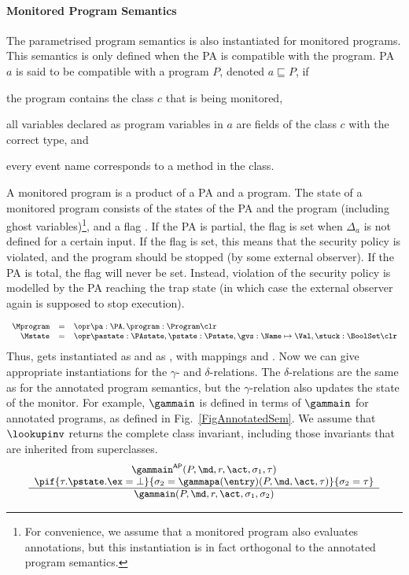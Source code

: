 \paragraph{Monitored Program Semantics}
The parametrised program semantics is also instantiated for monitored
programs. This semantics is only defined when the PA is compatible
with the program. PA \(a\) is said to be compatible with a program
\(P\), denoted \(a \sqsubseteq P\), if
\begin{inparaenum}
\item the program contains the class \(c\) that is being monitored,
\item all variables declared as program variables in
\(a\) are fields of the class \(c\) with the correct type, and
\item every event name corresponds to a method in the class.
\end{inparaenum}
A monitored program is a product of a PA and a program. The state of a
monitored program consists of the states of the PA and the program
(including ghost variables)\footnote{For convenience, we assume that a
monitored program also evaluates annotations, but this instantiation
is in fact orthogonal to the annotated program semantics.}, and a flag
\stuck. If the PA is partial, the flag
\stuck is set when \(\Delta_a\) is not defined for a
certain input. If the flag is set, this means that the security policy
is violated, and the program should be stopped (by some external
observer). If the PA is total, the \stuck flag will never be
set. Instead, violation of the security policy is modelled by the PA
reaching the trap state \halted (in which case the external observer
again is supposed to stop execution).

\vspace*{-1em}
\[
{\small
\begin{array}{rcl}
\Mprogram & =  & \opr \pa : \PA, \program : \Program \clr\\
\Mstate & = & \opr \pastate : \PAstate, \pstate : \Pstate, \gvs :  \Name \mapsto \Val, \stuck
: \BoolSet \clr
\end{array}}
\]
Thus, \FullProgram gets instantiated as \Mprogram and \FullState as
\Mstate, with mappings \program and \pstate. Now we can give
appropriate instantiations for the \(\gamma\)- and
\(\delta\)-relations. The \(\delta\)-relations are the same as
for the annotated program semantics, but the \(\gamma\)-relation also
updates the state of the monitor. For example, \(\gammain\) is defined
in terms of \(\gammain\) for annotated programs, as defined in
Fig.~\ref{FigAnnotatedSem}.
We assume that \(\lookupinv\) returns the complete class invariant, including
those invariants that are inherited from superclasses.
\[
{\small
\begin{array}{c}
\gammain^{\mathsf{AP}}(P, \md, r, \act, \sigma_1, \tau) \\
\pif{\tau.\pstate.\ex = \bot}
    {\sigma_2 = \gammapa(\entry)(P, \md, \act, \tau)}
    {\sigma_2 = \tau}\\
\hline
\gammain(P, \md, r, \act, \sigma_1, \sigma_2)
\end{array}}
\]


